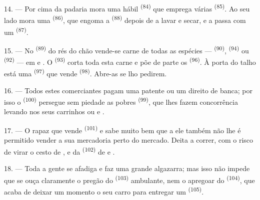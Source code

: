 14. --- Por cima da padaria mora uma hábil 
\textsuperscript{(84)} que emprega várias  \textsuperscript{(85)}. Ao
seu lado mora uma  \textsuperscript{(86)}, que
engoma a  \textsuperscript{(88)} depois de a lavar e secar, e
a passa com um  \textsuperscript{(87)}.

\VUsaut{4.0mm}
\VUsaut{3.0mm}

15. --- No  \textsuperscript{(89)} do rés do chão vende-se carne de
todas as espécies ---  \textsuperscript{(90)}, 
\textsuperscript{(94)} ou  \textsuperscript{(92)} --- em  e . O  \textsuperscript{(93)} corta toda esta carne e põe de parte os  \textsuperscript{(96)}. À porta do talho está uma  \textsuperscript{(97)} que vende  \textsuperscript{(98)}. Abre-as
se lho pedirem.

16. --- Todos estes comerciantes pagam uma patente ou um direito de
banca; por isso o  \textsuperscript{(100)} persegue sem piedade as
pobres  \textsuperscript{(99)}, que lhes fazem
concorrência levando nos seus carrinhos  ou  e .

\VUsaut{4.0mm}
\VUsaut{3.0mm}

17. --- O rapaz que vende  \textsuperscript{(101)} e 
sabe muito bem que a ele também não lhe é permitido vender a sua
mercadoria perto do mercado. Deita a correr, com o risco de virar o cesto
de ,  e  da
 \textsuperscript{(102)} de  e
.

18. --- Toda a gente se afadiga e faz uma grande algazarra; mas isso não
impede que se ouça claramente o pregão do 
\textsuperscript{(103)} ambulante, nem o apregoar do 
\textsuperscript{(104)}, que acaba de deixar um momento o seu carro para entregar
um  \textsuperscript{(105)}.
\VUsaut{6.0mm}
\VUfilet{22mm}
